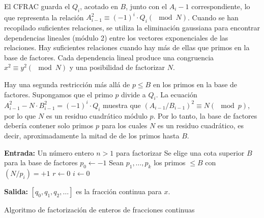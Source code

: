     El CFRAC guarda el $Q_i$, acotado en $B$, junto con el $A_i-1$ correspondiente, lo que representa la relación $A^2_{i-1} \equiv (-1)^i\cdot Q_i (\mod N)$. Cuando se han recopilado suficientes relaciones, se utiliza la eliminación gaussiana para encontrar dependencias lineales (módulo 2) entre los vectores exponenciales de las relaciones. Hay suficientes relaciones cuando hay más de ellas que primos en la base de factores. Cada dependencia lineal produce una congruencia $x^2 \equiv y^2 (\mod N)$ y una posibilidad de factorizar $N$.

    Hay una segunda restricción más allá de $p \leq B$ en los primos en la base de factores. Supongamos que el primo $p$ divide a $Q_i$. La ecuación $A^2_{i-1} - N\cdot B^2_{i-1} = (-1)^i \cdot Q_i$ muestra que $(A_{i-1}/B_{i-1})^2 \equiv N (\mod p)$, por lo que $N$ es un residuo cuadrático módulo $p$. Por lo tanto, la base de factores debería contener solo primos $p$ para los cuales $N$ es un residuo cuadrático, es decir, aproximadamente la mitad de de los primos hasta $B$.

    \begin{algorithm}[H]
        \SetAlgoLined
        \textbf{Entrada:} Un número entero $n > 1$ para factorizar\;
        Se elige una cota superior $B$ para la base de factores \;
        $p_0 \leftarrow -1$\;
        Sean $p_1, \dots, p_k$ los primos $\leq B$ con $(N/p_i)=+1$\;
        $r \leftarrow 0$\;
        $i \leftarrow 0$\;

        \textbf{Salida:} $[q_0, q_1, q_2, \dots]$ es la fracción continua para $x$.\ 
        \caption{Algoritmo de factorización de enteros de fracciones continuas}
    \end{algorithm}

